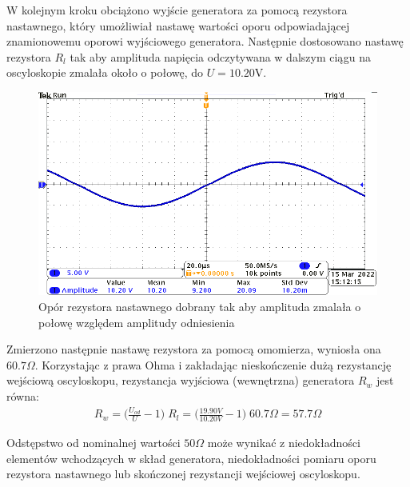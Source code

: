 \documentclass[11pt]{extarticle}
\begin{document}
	W kolejnym kroku obciążono wyjście generatora za pomocą rezystora nastawnego, który umożliwiał nastawę wartości oporu odpowiadającej znamionowemu oporowi wyjściowego generatora.
	Następnie dostosowano nastawę rezystora \(R_l\) tak aby amplituda napięcia odczytywana w dalszym ciągu na oscyloskopie zmalała około o połowę, do \(U=10.20\)V.
	
	\clearpage
	\begin{figure}[htp]
		\centering
		\includegraphics[width=\textwidth]{include/5/60.7R.png}
		\caption{Opór rezystora nastawnego dobrany tak aby amplituda zmalała o połowę względem amplitudy odniesienia}
	\end{figure}

	Zmierzono następnie nastawę rezystora za pomocą omomierza, wyniosła ona \(60.7\Omega\).
	Korzystając z prawa Ohma i zakładając nieskończenie dużą rezystancję wejściową oscyloskopu, rezystancja wyjściowa (wewnętrzna) generatora \(R_w\) jest równa: 
	\begin{align}
		R_w = \biggl(\frac{U_{od}}{U} - 1\biggr)\;R_l = 
		\biggl(\frac{19.90V}{10.20V} - 1\biggr)\;60.7\Omega = 57.7\Omega
	\end{align}

	Odstępstwo od nominalnej wartości \(50\Omega\) może wynikać z niedokładności elementów wchodzących w skład generatora, niedokładności pomiaru oporu rezystora nastawnego lub skończonej rezystancji wejściowej oscyloskopu.
\end{document}
